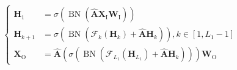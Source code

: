 \begin{equation}
	\begin{cases}
	\mathbf{H}_{1} & =\sigma\left(\operatorname{BN}\left(\hat{\mathbf{A}} \mathbf{X}_\mathrm{I} \mathbf{W}_\mathrm{I}\right)\right) \\
	\mathbf{H}_{k+1} & = \sigma\left(\operatorname{BN}\left(\mathcal{F}_k\left(\mathbf{H}_{k} \right) + \hat{\mathbf{A}} \mathbf{H}_{k}\right)\right), k \in [1, L_1-1] \\
	\mathbf{X}_\mathrm{O} & = \hat{\mathbf{A}}\left(\sigma\left(\operatorname{BN}\left(\mathcal{F}_{L_1}\left( \mathbf{H}_{L_1} \right) + \hat{\mathbf{A}} \mathbf{H}_{k}\right)\right)\right) \mathbf{W}_\mathrm{O}
	\end{cases}
    \label{formula:嵌入层特征矩阵方程}
\end{equation}
